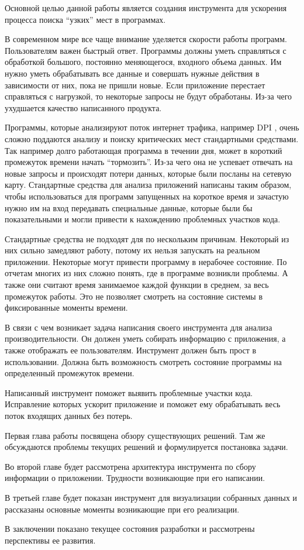 
\startprefacepage
	Основной целью данной работы является создания инструмента для ускорения процесса поиска \enquote{узких} мест в программах.  

	В современном мире все чаще внимание уделяется скорости работы программ. Пользователям важен быстрый ответ. Программы должны уметь справляться с обработкой большого, постоянно меняющегося, входного объема данных. Им нужно уметь обрабатывать все данные и совершать нужные действия в зависимости от них, пока не пришли новые. Если приложение перестает справляться с нагрузкой, то некоторые запросы не будут обработаны. Из-за чего ухудшается качество написанного продукта.

	Программы, которые анализируют поток интернет трафика, например DPI \cite{dpi}, очень сложно поддаются анализу и поиску критических мест стандартными средствами. Так например долго работающая программа в течении дня, может в короткий промежуток времени начать \enquote{тормозить}. Из-за чего она не успевает отвечать на новые запросы и происходят потери данных, которые были посланы на сетевую карту. Стандартные средства для анализа приложений написаны таким образом, чтобы использоваться для программ запущенных на короткое время и зачастую нужно им на вход передавать специальные данные, которые были бы показательными и могли привести к нахождению проблемных участков кода.

	Стандартные средства не подходят для  по нескольким причинам. Некоторый из них сильно замедляют работу, потому их нельзя запускать на реальном приложении. Некоторые могут привести программу в нерабочее состояние. По отчетам многих из них сложно понять, где в программе возникли проблемы. А также они считают время занимаемое каждой функции в среднем, за весь промежуток работы. Это не позволяет смотреть на состояние системы в фиксированные моменты времени.
    
    В связи с чем возникает задача написания своего инструмента для анализа производительности. Он должен уметь собирать информацию с приложения, а также отображать ее пользователям. Инструмент должен быть прост в использовании. Должна быть возможность смотреть состояние программы на определенный промежуток времени.  
    
    Написанный инструмент поможет выявить проблемные участки кода. Исправление которых ускорит приложение и поможет ему обрабатывать весь поток входящих данных без потерь.

	Первая глава работы посвящена обзору существующих решений. Там же обсуждаются проблемы текущих решений и формулируется постановка задачи. 

	Во второй главе будет рассмотрена архитектура инструмента по сбору информации о приложении. Трудности возникающие при его написании.

	В третьей главе будет показан инструмент для визуализации собранных данных и рассказаны основные моменты возникающие при его реализации.

В заключении  показано текущее состояния разработки и рассмотрены перспективы ее развития. 
